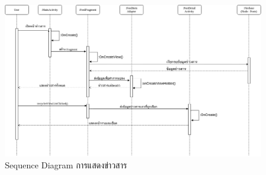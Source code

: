 \newpage
	\begin{landscape}
	\begin{figure}[H]
		\centering
		\includegraphics[width=0.95\columnwidth]
		{Figures/3/Sequence/feed}
		\caption{Sequence Diagram การแสดงข่าวสาร}
		\label{Fig:Sequence-feed}
	\end{figure}
  \end{landscape}

